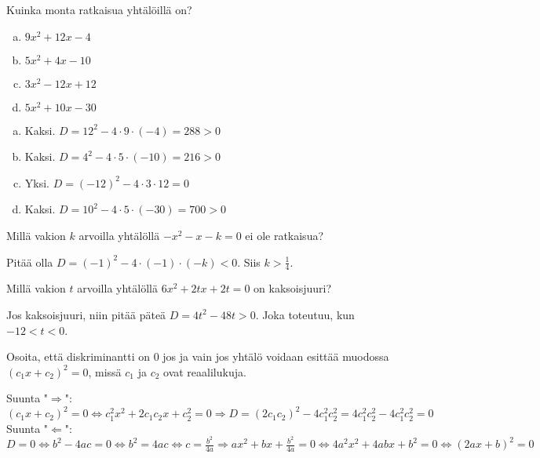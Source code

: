 \begin{tehtavasivu}

\begin{tehtava}
	Kuinka monta ratkaisua yhtälöillä on?
	\begin{enumerate}[a)]
		\item $9x^2+12x-4$
		\item $5x^2+4x-10$
		\item $3x^2-12x+12$
		\item $5x^2+10x-30$
	\end{enumerate}
	\begin{vastaus}
		\begin{enumerate}[a)]
			\item Kaksi. $D=12^2-4 \cdot 9 \cdot (-4) = 288 >0$
			\item Kaksi. $D=4^2-4\cdot 5 \cdot (-10) = 216 >0$
			\item Yksi. $D=(-12)^2-4\cdot 3\cdot 12 =0$
			\item Kaksi. $D=10^2-4\cdot 5 \cdot (-30) = 700 >0$
		\end{enumerate}
	\end{vastaus}
\end{tehtava}

\begin{tehtava}
	Millä vakion $k$ arvoilla yhtälöllä $-x^2-x-k = 0$ ei ole ratkaisua?
	\begin{vastaus}
		Pitää olla $D=(-1)^2-4 \cdot (-1) \cdot (-k)<0$. Siis $k>\frac{1}{4}$.
	\end{vastaus}
\end{tehtava}

\begin{tehtava}
	Millä vakion $t$ arvoilla yhtälöllä $6x^2+2tx+2t=0$ on kaksoisjuuri?
	\begin{vastaus}
		Jos kaksoisjuuri, niin pitää päteä $D=4t^2-48t>0$. Joka toteutuu, kun $-12 < t < 0$.
	\end{vastaus}
\end{tehtava}

\begin{tehtava}
	Osoita, että diskriminantti on $0$ jos ja vain jos yhtälö voidaan esittää muodossa $(c_1 x+ c_2)^2=0$, missä $c_1$ ja $c_2$ ovat reaalilukuja.
	\begin{vastaus}
		Suunta "$\Rightarrow$": $(c_1 x+ c_2)^2=0 \Leftrightarrow c_1^2 x^2 + 2c_1 c_2 x+ c_2^2 =0 \Rightarrow
		D=(2 c_1 c_2)^2-4 c_1^2 c_2^2 =4 c_1^2 c_2^2 -4 c_1^2 c_2^2 =0$ \\
		Suunta "$\Leftarrow$": $D=0 \Leftrightarrow b^2-4ac=0 \Leftrightarrow b^2=4ac \Leftrightarrow c=\frac{b^2}{4a} \Rightarrow ax^2+bx+\frac{b^2}{4a}=0 \Leftrightarrow 4a^2x^2+4abx+b^2=0 \Leftrightarrow (2ax+b)^2=0$
	\end{vastaus}
\end{tehtava}

\end{tehtavasivu}
